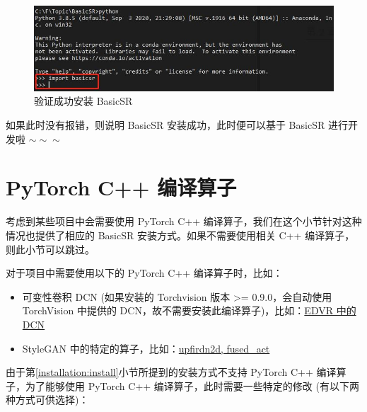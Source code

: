 \documentclass[../main.tex]{subfiles}
\begin{document}
\begin{figure}[H]
    \begin{center}
        \includegraphics[width=0.9\linewidth]{figures/installation_correct_install.jpg}
        \caption{验证成功安装 BasicSR}
        \label{fig:correct-install}
    \end{center}
    \vspace{-0.5cm}
\end{figure}

如果此时没有报错，则说明 BasicSR 安装成功，此时便可以基于 BasicSR 进行开发啦 $\sim \sim \sim$

\section{PyTorch C++ 编译算子}
\label{installation:c++}

考虑到某些项目中会需要使用 PyTorch C++ 编译算子，我们在这个小节针对这种情况也提供了相应的 BasicSR 安装方式。如果不需要使用相关 C++ 编译算子，则此小节可以跳过。

对于项目中需要使用以下的 PyTorch C++ 编译算子时，比如：

\begin{itemize}
    \item 可变性卷积 DCN (如果安装的 Torchvision 版本 >= 0.9.0，会自动使用 TorchVision 中提供的 DCN，故不需要安装此编译算子)，比如：\href{https://github.com/XPixelGroup/BasicSR/tree/master/basicsr/ops}{EDVR 中的 DCN}

    \item StyleGAN 中的特定的算子，比如：\href{https://github.com/XPixelGroup/BasicSR/tree/master/basicsr/ops}{upfirdn2d, fused\_act}
\end{itemize}

由于第\ref{installation:install}小节所提到的安装方式不支持 PyTorch C++ 编译算子，为了能够使用 PyTorch C++ 编译算子，此时需要一些特定的修改 (有以下两种方式可供选择)：
\end{document}
